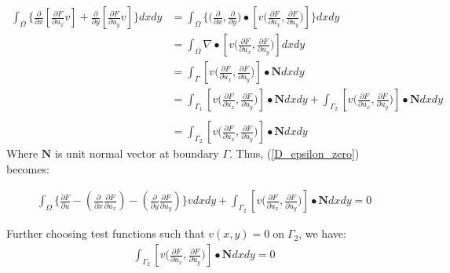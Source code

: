 \begin{align}\label{GTuse}
    \int_{\Omega} \Bigg\{ \frac{\partial }{\partial x} \left [ \frac{\partial F}{\partial u_x}v \right] + \frac{\partial }{\partial y} \left [ \frac{\partial F}{\partial u_y}v \right] \Bigg\}dxdy & =  \int_{\Omega} \Bigg\{ \Bigg(\frac{\partial }{\partial x}  , \frac{\partial }{\partial y}\Bigg) \bullet \left [v \Bigg( \frac{\partial F}{\partial u_x} ,  \frac{\partial F}{\partial u_y} \Bigg) \right]\Bigg\}dxdy \nonumber\\
    & =  \int_{\Omega} \nabla  \bullet \left [v \Bigg( \frac{\partial F}{\partial u_x} ,  \frac{\partial F}{\partial u_y} \Bigg) \right]dxdy \nonumber\\
    & =  \int_{\Gamma} \left [v \Bigg( \frac{\partial F}{\partial u_x} ,  \frac{\partial F}{\partial u_y} \Bigg) \right]\bullet \mathbf{N} dxdy \nonumber\\
    & =  \int_{\Gamma_1} \left [v \Bigg( \frac{\partial F}{\partial u_x} ,  \frac{\partial F}{\partial u_y} \Bigg) \right]\bullet \mathbf{N} dxdy +  \int_{\Gamma_2} \left [v \Bigg( \frac{\partial F}{\partial u_x} ,  \frac{\partial F}{\partial u_y} \Bigg) \right]\bullet \mathbf{N} dxdy \nonumber\\\nonumber\\
    & =  \int_{\Gamma_2} \left [v \Bigg( \frac{\partial F}{\partial u_x} ,  \frac{\partial F}{\partial u_y} \Bigg) \right]\bullet \mathbf{N} dxdy
\end{align}
\noindent
Where $\mathbf{N}$ is unit normal vector at boundary $\Gamma$. Thus, (\ref{D_epsilon_zero}) becomes:

\begin{align}\label{D_epsilon_zero_main}
     \int_{\Omega} \Bigg\{  \frac{\partial F}{\partial u}    - \left(\frac{\partial }{\partial x} \frac{\partial F}{\partial u_x} \right)   - \left(\frac{\partial }{\partial y} \frac{\partial F}{\partial u_y} \right)    \Bigg\}v dxdy + \int_{\Gamma_2} \left [v \Bigg( \frac{\partial F}{\partial u_x} ,  \frac{\partial F}{\partial u_y} \Bigg) \right]\bullet \mathbf{N} dxdy = 0
\end{align}

\noindent
Further choosing test functions such that $v(x,y)=0\mathrm{\;on\;}\Gamma_2$, we have:
\begin{align}\label{BC}
    \int_{\Gamma_2} \left [v \Bigg( \frac{\partial F}{\partial u_x} ,  \frac{\partial F}{\partial u_y} \Bigg) \right]\bullet \mathbf{N} dxdy = 0
\end{align}

